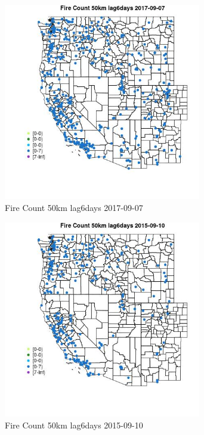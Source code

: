 \begin{figure} 
\centering  
\includegraphics[width=0.77\textwidth]{Code_Outputs/Report_ML_input_PM25_Step4_part_e_de_duplicated_aves_compiled_2019-05-20wNAs_MapObsFire_Count_50km_lag6days2017-09-07.jpg} 
\caption{\label{fig:Report_ML_input_PM25_Step4_part_e_de_duplicated_aves_compiled_2019-05-20wNAsMapObsFire_Count_50km_lag6days2017-09-07}Fire Count 50km lag6days 2017-09-07} 
\end{figure} 
 

\begin{figure} 
\centering  
\includegraphics[width=0.77\textwidth]{Code_Outputs/Report_ML_input_PM25_Step4_part_e_de_duplicated_aves_compiled_2019-05-20wNAs_MapObsFire_Count_50km_lag6days2015-09-10.jpg} 
\caption{\label{fig:Report_ML_input_PM25_Step4_part_e_de_duplicated_aves_compiled_2019-05-20wNAsMapObsFire_Count_50km_lag6days2015-09-10}Fire Count 50km lag6days 2015-09-10} 
\end{figure} 
 

